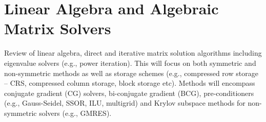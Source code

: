 \chapter{Linear Algebra and Algebraic Matrix Solvers}
Review of linear algebra, direct and iterative matrix solution algorithms including eigenvalue solvers (e.g., power iteration). This will focus on both symmetric and non-symmetric methods as well as storage schemes (e.g., compressed row storage – CRS, compressed column storage, block storage etc). Methods will encompass conjugate gradient (CG) solvers, bi-conjugate gradient (BCG), pre-conditioners (e.g., Gauss-Seidel, SSOR, ILU, multigrid) and Krylov subspace methods for non-symmetric solvers (e.g., GMRES).    
